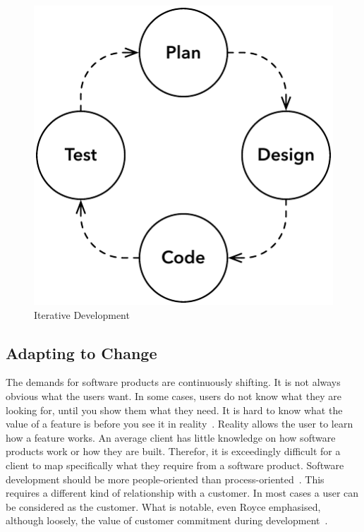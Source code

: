 \documentclass[english]{tktltiki2}
\begin{document}
\begin{figure}[h!]

    \centering
    \vspace{1cm}

    \includegraphics[scale = 0.6]{figures/iterative-development}

    \caption{Iterative Development}
    \label{figure:iterative-development}

\end{figure}

\subsection{Adapting to Change}

The demands for software products are continuously shifting. It is not always obvious what the users want. In some cases, users do not know what they are looking for, until you show them what they need. It is hard to know what the value of a feature is before you see it in reality~\cite{Fow05}. Reality allows the user to learn how a feature works. An average client has little knowledge on how software products work or how they are built. Therefor, it is exceedingly difficult for a client to map specifically what they require from a software product. Software development should be more people-oriented than process-oriented~\cite{Fow05}. This requires a different kind of relationship with a customer. In most cases a user can be considered as the customer. What is notable, even Royce emphasised, although loosely, the value of customer commitment during development~\cite{Roy70}.
\end{document}
